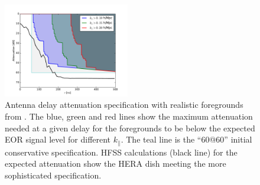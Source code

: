\documentclass[preprint,11pt]{aastex}
\def\kpar{k_{\|}}
\begin{document}
\begin{figure}[h!]
	\centering
    \includegraphics[width=0.49\textwidth]{plots/delayspecplot.pdf}
	\caption{Antenna delay attenuation specification with realistic foregrounds from \cite{thyagarajan_et_al2016}.  
	The blue, green and red lines show the maximum attenuation needed at a given delay for the foregrounds to be below the expected EOR signal level for different $\kpar$.
	The teal line is the ``60@60'' initial conservative specification.
	 HFSS calculations (black line) for the expected attenuation show the HERA dish meeting the more sophisticated specification. 
}
	\label{fig:delayspec}
	\vspace{-10pt}
\end{figure}
\end{document}
